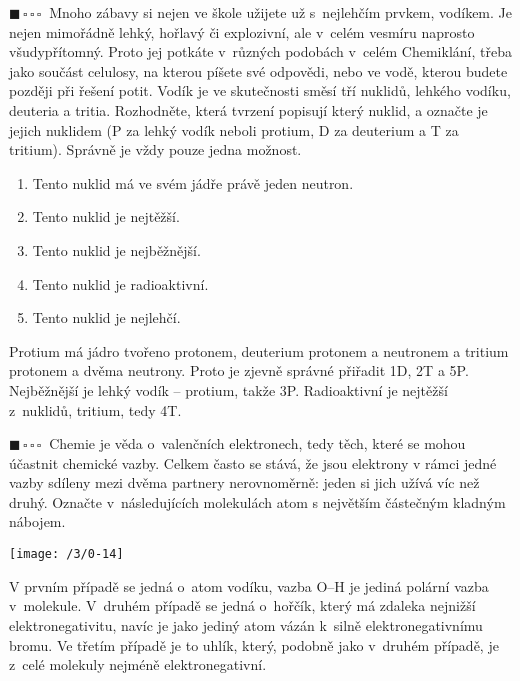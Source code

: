 \documentclass{book}
\newcommand{\jeden}{$\blacksquare \, \square \, \square \, \square \; \; $}
\renewenvironment{quotation}{\par}{\par} %
\begin{document}
\begin{quotation}
\jeden Mnoho zábavy si nejen ve škole užijete už s~nejlehčím prvkem, vodíkem.
Je nejen mimořádně lehký, hořlavý či explozivní, ale v~celém vesmíru
naprosto všudypřítomný. Proto jej potkáte v~různých podobách v~celém
Chemiklání, třeba jako součást celulosy, na kterou píšete své odpovědi,
nebo ve vodě, kterou budete později při řešení potit. Vodík je ve
skutečnosti směsí tří nuklidů, lehkého vodíku, deuteria a tritia.
Rozhodněte, která tvrzení popisují který nuklid, a označte je jejich
nuklidem (P za lehký vodík neboli protium, D za deuterium a T za tritium).
Správně je vždy pouze jedna možnost. 
\begin{enumerate}
\item Tento nuklid má ve svém jádře právě jeden neutron. 
\item Tento nuklid je nejtěžší. 
\item Tento nuklid je nejběžnější. 
\item Tento nuklid je radioaktivní. 
\item Tento nuklid je nejlehčí. 
\end{enumerate}
\end{quotation} \dotfill \par 
Protium má jádro tvořeno protonem, deuterium protonem a neutronem
a tritium protonem a dvěma neutrony. Proto je zjevně správné přiřadit
1D, 2T a 5P. Nejběžnější je lehký vodík -- protium,
takže 3P. Radioaktivní je nejtěžší z~nuklidů, tritium, tedy 4T.

\hrulefill %
\begin{quotation}
\jeden Chemie je věda o~valenčních elektronech, tedy těch, které se mohou
účastnit chemické vazby. Celkem často se stává, že jsou elektrony
v rámci jedné vazby sdíleny mezi dvěma partnery nerovnoměrně: jeden
si jich užívá víc než druhý. Označte v~následujících molekulách atom
s největším částečným kladným nábojem.
\begin{center}

\texttt{[image: /3/0-14]}

\par\end{center}

\end{quotation} \dotfill \par 
V prvním případě se jedná o~atom vodíku, vazba O--H je jediná polární
vazba v~molekule. V~druhém případě se jedná o~hořčík, který má zdaleka
nejnižší elektronegativitu, navíc je jako jediný atom vázán k~silně
elektronegativnímu bromu. Ve třetím případě je to uhlík, který, podobně
jako v~druhém případě, je z~celé molekuly nejméně elektronegativní.
\end{document}
